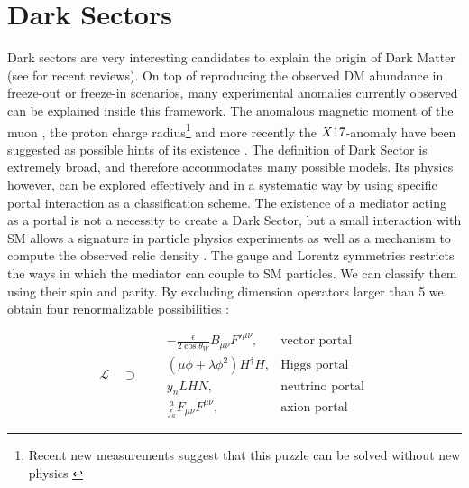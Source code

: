 \section{Dark Sectors}
\label{ch1:sec:dm-sector}

Dark sectors are very interesting candidates to explain the origin of Dark Matter (see \cite{battaglieri2017cosmic,alex2016dark} for recent reviews). On top of reproducing the observed DM abundance in freeze-out or freeze-in scenarios, many experimental anomalies currently observed can be explained inside this framework. The anomalous magnetic moment of the muon \cite{blum2013muon}, the proton charge radius\footnote{Recent new measurements suggest that this puzzle can be solved without new physics \cite{Karshenboim2019}} \cite{Pohl2010} and more recently the $X17$-anomaly \cite{Krasznahorkay:2015iga,Krasznahorkay:2019lyl} have been suggested as possible hints of its existence \cite{alex2016dark}. The definition of Dark Sector is extremely broad, and therefore accommodates many possible models. Its physics however, can be explored effectively and in a systematic way by using specific portal interaction as a classification scheme.  The existence of a mediator acting as a portal is not a necessity to create a Dark Sector, but a small interaction with SM allows a signature in particle physics experiments as well as a mechanism to compute the observed relic density \cite{prw, pospelov}. The gauge and Lorentz symmetries restricts the ways in which the mediator can couple to SM particles. We can classify them using their spin and parity. By excluding dimension operators larger than 5 we obtain four renormalizable possibilities \cite{alex2016dark}:

\begin{equation}
  \label{eq:dm-portals}
  \mathcal{L} \quad \supset \quad
\begin{aligned}
  &-\frac{\epsilon}{2 \cos{\theta_W}}B_{\mu \nu}F'^{\mu \nu}, &\textrm{vector portal}\\
  & (\mu \phi + \lambda \phi^2)H^{\dagger}H, &\textrm{Higgs portal}\\
  &y_n LHN, &\textrm{neutrino portal} \\
  &\frac{a}{f_a} F_{\mu \nu} F^{\mu \nu}, &\textrm{axion portal}
\end{aligned}
\end{equation}

